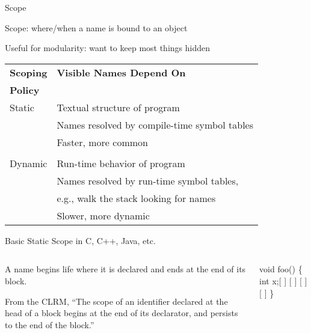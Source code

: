 \documentclass{plt}
\begin{document}
\begin{frame}{Scope}

Scope: where/when a name is bound to an object

Useful for modularity: want to keep most things hidden

\medskip

\begin{center}
\begin{tabular}{ll}
\toprule
\textbf{Scoping} & \textbf{Visible Names Depend On} \\
\textbf{Policy} \\
\midrule
Static & Textual structure of program \\
  & Names resolved by compile-time symbol tables \\
  & Faster, more common \\
\\
Dynamic & Run-time behavior of program \\
  & Names resolved by run-time symbol tables,\\
  & e.g., walk the stack looking for names \\
  & Slower, more dynamic \\
\bottomrule
\end{tabular}
\end{center}

\end{frame}


\begin{frame}[fragile]{Basic Static Scope in C, C++, Java, etc.}
  \begin{columns}
    \begin{column}{0.5\textwidth}
\parskip=1pc

A name begins life where it is declared and ends at the end
of its block.

From the CLRM, ``The scope of an identifier declared at the head of a
block begins at the end of its declarator, and persists to the end of
the block.''
    \end{column}
    \begin{column}{0.5\textwidth}
\begin{showscope}
void foo()
\{
   int x;[                 ]
[                          ]
[                          ]
[                          ]
\}%
\end{showscope}
    \end{column}
  \end{columns}
\end{frame}
\end{document}
